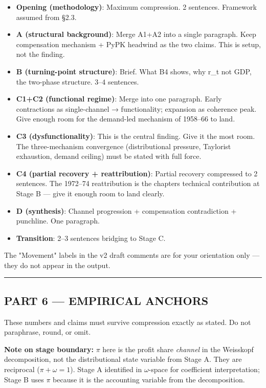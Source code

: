 \begin{itemize}
\tightlist
\item
  \textbf{Opening (methodology)}: Maximum compression. 2 sentences.
  Framework assumed from §2.3.
\item
  \textbf{A (structural background)}: Merge A1+A2 into a single
  paragraph. Keep compensation mechanism + PyPK headwind as the two
  claims. This is setup, not the finding.
\item
  \textbf{B (turning-point structure)}: Brief. What B4 shows, why r\_t
  not GDP, the two-phase structure. 3--4 sentences.
\item
  \textbf{C1+C2 (functional regime)}: Merge into one paragraph. Early
  contractions as single-channel → functionality; expansion as coherence
  peak. Give enough room for the demand-led mechanism of 1958--66 to
  land.
\item
  \textbf{C3 (dysfunctionality)}: This is the central finding. Give it
  the most room. The three-mechanism convergence (distributional
  pressure, Taylorist exhaustion, demand ceiling) must be stated with
  full force.
\item
  \textbf{C4 (partial recovery + reattribution)}: Partial recovery
  compressed to 2 sentences. The 1972--74 reattribution is the
  chapter\textquotesingle s technical contribution at Stage B --- give
  it enough room to land clearly.
\item
  \textbf{D (synthesis)}: Channel progression + compensation
  contradiction + punchline. One paragraph.
\item
  \textbf{Transition}: 2--3 sentences bridging to Stage C.
\end{itemize}

The "Movement" labels in the v2 draft comments are for your orientation
only --- they do not appear in the output.

\begin{center}\rule{0.5\linewidth}{0.5pt}\end{center}

\subsection{PART 6 --- EMPIRICAL
ANCHORS}\label{part-6--empirical-anchors}

These numbers and claims must survive compression exactly as stated. Do
not paraphrase, round, or omit.

\textbf{Note on stage boundary:} \(\pi\) here is the profit share
\emph{channel} in the Weisskopf decomposition, not the distributional
state variable from Stage A. They are reciprocal (\(\pi + \omega = 1\)).
Stage A identified in \(\omega\)-space for coefficient interpretation;
Stage B uses \(\pi\) because it is the accounting variable from the
decomposition.

